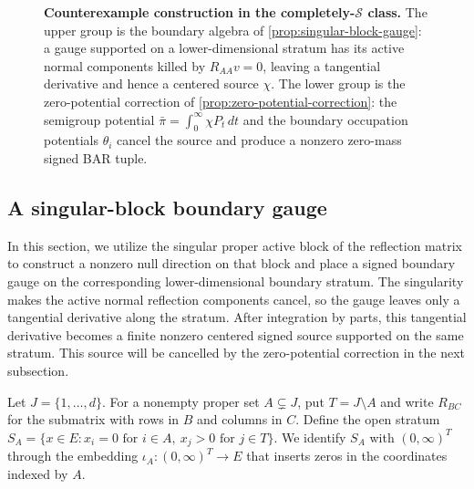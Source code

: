 \documentclass[aihp]{imsart}
\numberwithin{equation}{section}
\theoremstyle{plain}
\theoremstyle{definition}
\newcommand{\1}{\mathbf 1}
\begin{document}
\begin{figure}[t]
{%
}
\caption{\textbf{Counterexample construction in the completely-$\mathcal{S}$ class.}  The upper group is the boundary algebra of \cref{prop:singular-block-gauge}: a gauge supported on a lower-dimensional stratum has its active normal components killed by $R_{AA}v=0$, leaving a tangential derivative and hence a centered source $\chi$.  The lower group is the zero-potential correction of \cref{prop:zero-potential-correction}: the semigroup potential $\bar\pi=\int_0^\infty \chi P_t\,dt$ and the boundary occupation potentials $\theta_i$ cancel the source and produce a nonzero zero-mass signed BAR tuple.}
\label{fig:counterexample-architecture}
\end{figure}

\subsection{A singular-block boundary gauge}

In this section, we utilize the singular proper active block of the reflection matrix to construct a nonzero null direction on that block and place a signed boundary gauge on the corresponding lower-dimensional boundary stratum. The singularity makes the active normal reflection components cancel, so the gauge leaves only a tangential derivative along the stratum. After integration by parts, this tangential derivative becomes a finite nonzero centered signed source supported on the same stratum. This source will be cancelled by the zero-potential correction in the next subsection.

Let $J=\{1,\ldots,d\}$. For a nonempty proper set $A\subsetneq J$, put $T=J\setminus A$ and write $R_{BC}$ for the submatrix with rows in $B$ and columns in $C$. Define the open stratum
$S_A=\{x\in E:x_i=0\text{ for }i\in A,\ x_j>0\text{ for }j\in T\}.$ We identify $S_A$ with $(0,\infty)^T$ through the embedding $\iota_A:(0,\infty)^T\to E$ that inserts zeros in the coordinates indexed by $A$.
\end{document}
